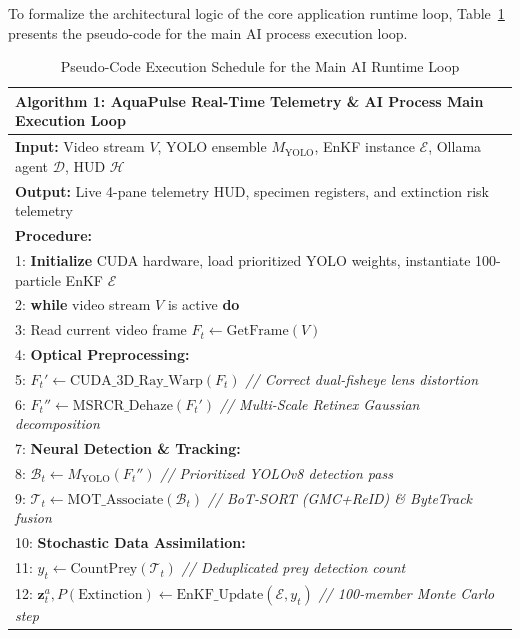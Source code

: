 \documentclass[11pt,a4paper]{article}
\newcommand{\refblue}[1]{{\color{linkblue}\ref{#1}}}
\begin{document}
To formalize the architectural logic of the core application runtime loop, Table~\refblue{tab:pseudocode_main} presents the pseudo-code for the main AI process execution loop.

\begin{table}[htbp]
\caption{Pseudo-Code Execution Schedule for the Main AI Runtime Loop}
\label{tab:pseudocode_main}
\centering
\small
\begin{tabular}{p{15cm}}
\toprule
\textbf{Algorithm 1: AquaPulse Real-Time Telemetry \& AI Process Main Execution Loop} \\
\midrule
\textbf{Input:} Video stream $V$, YOLO ensemble $M_{\text{YOLO}}$, EnKF instance $\mathcal{E}$, Ollama agent $\mathcal{D}$, HUD $\mathcal{H}$ \\
\textbf{Output:} Live 4-pane telemetry HUD, specimen registers, and extinction risk telemetry \\
\textbf{Procedure:} \\
1: \textbf{Initialize} CUDA hardware, load prioritized YOLO weights, instantiate 100-particle EnKF $\mathcal{E}$ \\
2: \textbf{while} video stream $V$ is active \textbf{do} \\
3: \quad Read current video frame $F_t \leftarrow \text{GetFrame}(V)$ \\
4: \quad \textbf{Optical Preprocessing:} \\
5: \qquad $F_t' \leftarrow \text{CUDA\_3D\_Ray\_Warp}(F_t)$ \quad \textit{// Correct dual-fisheye lens distortion} \\
6: \qquad $F_t'' \leftarrow \text{MSRCR\_Dehaze}(F_t')$ \quad \textit{// Multi-Scale Retinex Gaussian decomposition} \\
7: \quad \textbf{Neural Detection \& Tracking:} \\
8: \qquad $\mathcal{B}_t \leftarrow M_{\text{YOLO}}(F_t'')$ \quad \textit{// Prioritized YOLOv8 detection pass} \\
9: \qquad $\mathcal{T}_t \leftarrow \text{MOT\_Associate}(\mathcal{B}_t)$ \quad \textit{// BoT-SORT (GMC+ReID) \& ByteTrack fusion} \\
10: \quad \textbf{Stochastic Data Assimilation:} \\
11: \qquad $y_t \leftarrow \text{CountPrey}(\mathcal{T}_t)$ \quad \textit{// Deduplicated prey detection count} \\
12: \qquad $\mathbf{z}_t^a, P(\text{Extinction}) \leftarrow \text{EnKF\_Update}(\mathcal{E}, y_t)$ \quad \textit{// 100-member Monte Carlo step} \\

\end{tabular}
\end{table}
\end{document}
